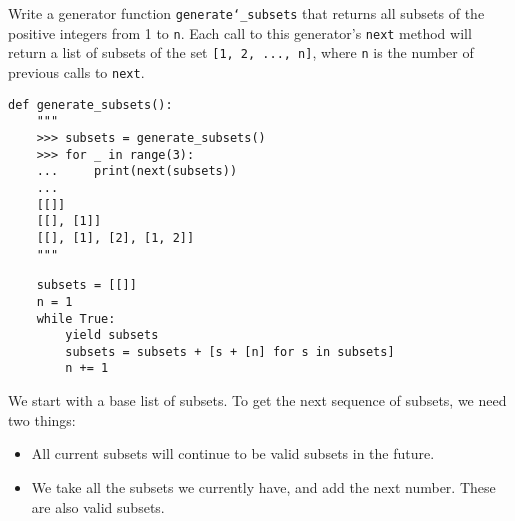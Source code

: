 \question Write a generator function \texttt{generate\char`_subsets} that
returns all subsets of the positive integers from 1 to \lstinline$n$.
Each call to this generator's \lstinline$next$ method will return a list of
subsets of the set \lstinline$[1, 2, ..., n]$, where \lstinline$n$ is the number
of previous calls to \texttt{next}.

\begin{lstlisting}
def generate_subsets():
    """
    >>> subsets = generate_subsets()
    >>> for _ in range(3):
    ...     print(next(subsets))
    ...
    [[]]
    [[], [1]]
    [[], [1], [2], [1, 2]]
    """
\end{lstlisting}

\begin{solution}[0.5in]
\begin{lstlisting}
    subsets = [[]]
    n = 1
    while True:
        yield subsets
        subsets = subsets + [s + [n] for s in subsets]
        n += 1
\end{lstlisting}
We start with a base list of subsets. To get the next sequence of subsets, we need two things:
\begin{itemize}
    \item All current subsets will continue to be valid subsets in the future.
    \item We take all the subsets we currently have, and add the next number.
        These are also valid subsets.
\end{itemize}
\end{solution}
